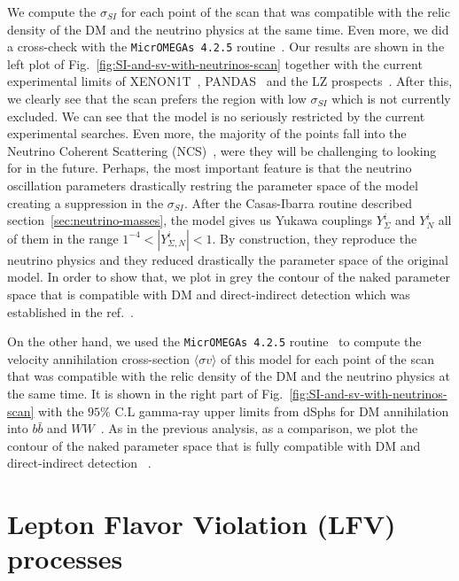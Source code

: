 \documentclass[12pt,letterpaper]{article}
\begin{document}
We compute the $\sigma_{SI}$ for each point of the scan that was compatible with the relic density of the DM and the neutrino physics at the same time. Even more, we did a cross-check with the \texttt{MicrOMEGAs 4.2.5} routine~\cite{Belanger:2006is}. 
Our results are shown in the left plot of Fig.~\ref{fig:SI-and-sv-with-neutrinos-scan} together with the current experimental limits of XENON1T~\cite{Aprile:2018dbl}, PANDAS~\cite{Cui:2017nnn} and the LZ prospects~\cite{Mount:2017qzi}. 
After this, we clearly see that the scan prefers the region with low $\sigma_{SI}$ which is not currently excluded.
We can see that the model is no seriously restricted by the current experimental searches. Even more, the majority of the points fall into the Neutrino Coherent Scattering (NCS)~\cite{Cushman:2013zza, Billard:2013qya}, were they will be challenging to looking for in the future.
Perhaps, the most important feature is that the neutrino oscillation parameters drastically restring the parameter space of the model creating a suppression in the $\sigma_{SI}$. 
After the Casas-Ibarra routine described section~\ref{sec:neutrino-masses}, the model gives us Yukawa couplings $Y_{\Sigma}^i$ and $Y_N^i$ all of them in the range $1^{-4}<|Y_{\Sigma, N}^i|<1$. By construction, they reproduce the neutrino physics and they reduced drastically the parameter space of the original model. In order to show that, we plot in grey the contour of the naked parameter space that is compatible with DM and direct-indirect detection which was established in the ref.~\cite{Hirsch:2013ola}.   

On the other hand, we used the \texttt{MicrOMEGAs 4.2.5} routine~\cite{Belanger:2006is} to compute the velocity annihilation cross-section $\langle \sigma v\rangle$ of this model for each point of the scan that was compatible with the relic density of the DM and the neutrino physics at the same time. 
It is shown in the right part of Fig.~\ref{fig:SI-and-sv-with-neutrinos-scan} with the $95\%$ C.L gamma-ray upper limits from dSphs for DM annihilation into $b\bar{b}$ and $WW$~\cite{Ackermann:2015zua}.
As in the previous analysis, as a comparison, we plot the contour of the naked parameter space that is fully compatible with DM and direct-indirect detection ~\cite{Hirsch:2013ola}.



\section{Lepton Flavor Violation (LFV) processes}
\label{sec:LFV}
\end{document}
